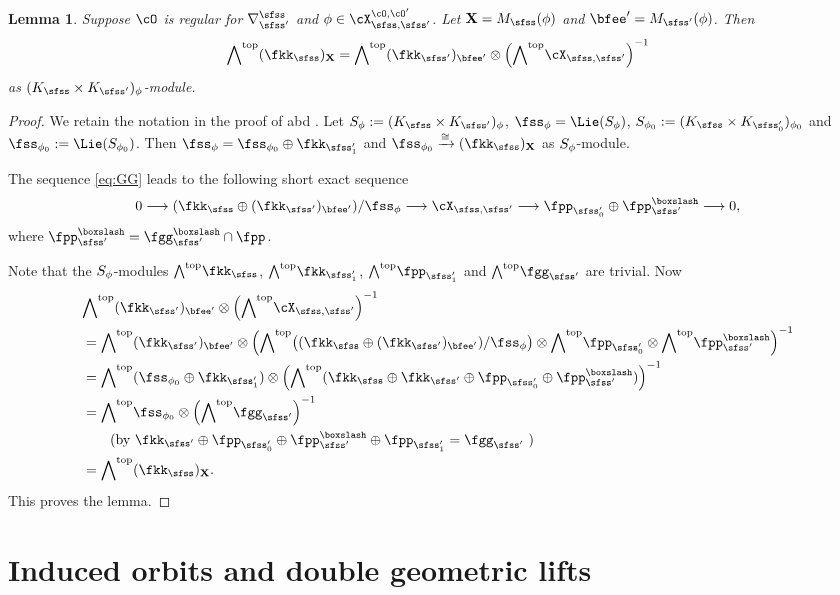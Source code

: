 \documentclass[12pt,a4paper]{amsart}
\newcommand{\X}{\mathbf{X}}
\numberwithin{equation}{section}
\newtheorem{lem}[thm]{Lemma}
\theoremstyle{remark}
\begin{document}
\begin{lem}\label{lem:tan}
  Suppose $\cO$ is regular for $\DDss$ and $\ww\in \CXOO$. Let $\X = \Ms(\ww)$ and
  $\Xp=\Msp(\ww)$.
  Then
  \begin{equation}\label{eq:aod}
    \wedgetop (\fkks)_{\X}  = \wedgetop (\fkksp)_{\Xp} \otimes \left(\wedgetop \CXss\right)^{{-1}}
  \end{equation}
  as $(\Ks\times \Ksp)_{\ww}$-module.
\end{lem}
\begin{proof}
  We retain the notation in the proof of  abd .
  Let $S_{\ww} := (\Ks\times \Ksp)_{\ww}$, $\fss_{\ww} = \Lie(S_{\ww})$,
   $S_{\wwo} := (\Ks\times \Kspo)_{\wwo}$ and $\fss_{\wwo} := \Lie(S_{\wwo})$.
  Then $\fss_{\ww} = \fss_{\wwo}\oplus \fkkspt$ and
  $\fss_{\wwo}\xrightarrow{\cong} (\fkks)_{\X}$ as $S_{\phi}$-module.

  The sequence \eqref{eq:GG} leads to the following short exact sequence
  \[
    0\longrightarrow (\fkks\oplus (\fkksp)_{\Xp})/ \fss_{\ww}
    \longrightarrow \CXss \longrightarrow \fpppso \oplus \fpppsb \longrightarrow 0,
  \]
  where $\fpppsb = \fggpsb\cap \fpp$.

  Note that the $S_{\phi}$-modules $\wedgetop \fkks$, $\wedgetop \fkkspt$,
$\wedgetop \fpppst$ and $\wedgetop \fggsp$ are trivial.
  Now
  \[
    \begin{split}
      & \wedgetop (\fkksp)_{\Xp} \otimes \left(\wedgetop \CXss\right)^{{-1}}\\
      & = \wedgetop (\fkksp)_{\Xp} \otimes
      \left(\wedgetop  \big((\fkks\oplus (\fkksp)_{\Xp})/\fss_{\ww}\big)
        \otimes \wedgetop \fpppso \otimes \wedgetop\fpppsb\right)^{-1}\\
      & =  \wedgetop (\fss_{\wwo} \oplus \fkkspt) \otimes
      \left(\wedgetop (\fkks \oplus \fkksp\oplus \fpppso \oplus \fpppsb )\right)^{{-1}} \\
      & = \wedgetop \fss_{\wwo} \otimes \left(\wedgetop \fggsp  \right)^{-1}\\
      & \qquad \text{(by $\fkksp \oplus \fpppso \oplus \fpppsb \oplus \fpppst = \fggsp $ )}\\
      & = \wedgetop (\fkks)_{\X}.
    \end{split}
  \]
 This proves the lemma.
\end{proof}

\section{Induced orbits and double geometric lifts}
\end{document}
